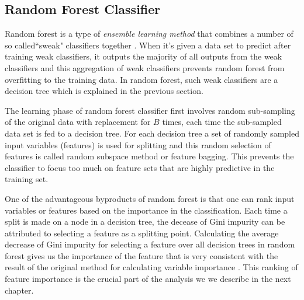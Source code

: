 	
		\subsection{Random Forest Classifier}
Random forest is a type of \textit{ensemble learning method} that combines a number of so called``sweak" classifiers together \cite{RandomForest}. When it's given a data set to predict after training weak classifiers, it outputs the majority of all outputs from the weak classifiers and this aggregation of weak classifiers prevents random forest from overfitting to the training data. In random forest, such weak classifiers are a decision tree which is explained in the previous section.

The learning phase of random forest classifier first involves random sub-sampling of the original data with replacement for $B$ times, each time the sub-sampled data set is fed to a decision tree. For each decision tree a set of randomly sampled input variables (features) is used for splitting and this random selection of features is called random subspace method or feature bagging. This prevents the classifier to focus too much on feature sets that are highly predictive in the training set. 

One of the advantageous byproducts of random forest is that one can rank input variables or features based on the importance in the classification. Each time a split is made on a node in a decision tree, the decease of Gini impurity can be attributed to selecting a feature as a splitting point.  Calculating the average decrease of Gini impurity for selecting a feature over all decision trees in random forest gives us the importance of the feature that is very consistent with the result of the original method for calculating variable importance \cite{RandomForest,RandomForestOnline}. This ranking of feature importance is the crucial part of the analysis we we describe in the next chapter.


